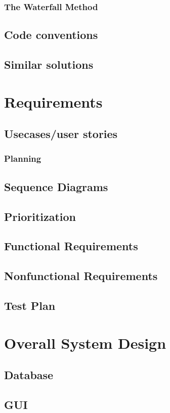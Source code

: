 \documentclass[10pt,a4paper,oneside]{report}
\begin{document}
\subsection{The Waterfall Method}
\section{Code conventions}
\section{Similar solutions}


\chapter{Requirements}
\section{Usecases/user stories}
\subsection{Planning}
\section{Sequence Diagrams}
\section{Prioritization}
\section{Functional Requirements}
\section{Nonfunctional Requirements}
\section{Test Plan}

\chapter{Overall System Design}
\section{Database}
\section{GUI}
\end{document}
